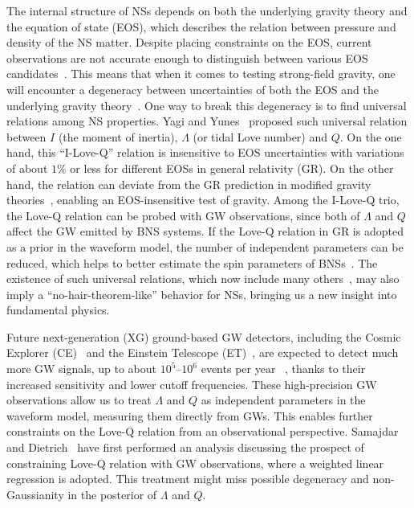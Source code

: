 \documentclass[a4paper,11pt]{article}
\begin{document}
The internal structure of NSs depends on both the underlying gravity theory 
and the equation of state (EOS), which describes the relation between pressure and
density of the NS matter. Despite placing constraints on the EOS, current 
observations are not accurate enough to distinguish between various EOS candidates~\cite{Lattimer:2006xb,Steiner:2010fz,Ozel:2010fw,Hebeler:2013nza,Özel_2013}. 
This means that when it comes to testing strong-field gravity, 
one will encounter a degeneracy between uncertainties of both the
EOS and the underlying gravity theory~\cite{Yagi:2013bca,Yagi:2013awa,Silva:2020acr,Shao:2022koz}. 
One way to break this degeneracy is to find universal relations among NS properties.
Yagi and Yunes~\cite{Yagi:2013bca,Yagi:2013awa} proposed such universal relation between 
$I$ (the moment of inertia), $\Lambda$ (or tidal Love number) and $Q$. 
On the one hand, this ``I-Love-Q'' relation is insensitive to EOS uncertainties 
with variations of about $1\%$ or less for different EOSs in general relativity (GR). 
On the other hand, the relation can deviate from the GR prediction in modified gravity theories~\cite{Yagi_2017,Gupta:2017vsl,Yunes:2025xwp}, 
enabling an EOS-insensitive test of gravity. Among the I-Love-Q trio, 
the Love-Q relation can be probed with GW observations, 
since both of $\Lambda$ and $Q$ affect the GW emitted by BNS systems. 
If the Love-Q relation in GR is adopted as a prior in the waveform
model, the number of independent parameters can be reduced, which helps to
better estimate the spin parameters of BNSs~\cite{Yagi:2013bca,LIGOScientific:2018cki,
LIGOScientific:2018hze,LIGOScientific:2020aai}. The existence of 
such universal relations, 
which now include many others~\cite{Lau:2009bu,Yagi:2013sva,Maselli:2013mva,Pani:2015nua,Yagi:2016qmr,Gao:2023mwu,Hu:2025gab}, 
may also imply a ``no-hair-theorem-like'' behavior for NSs, bringing us a new 
insight into fundamental physics. 

Future next-generation (XG) ground-based GW detectors, including the Cosmic Explorer 
(CE)~\cite{Reitze:2019iox,Reitze:2019dyk} and the Einstein Telescope (ET)~\cite{Punturo:2010zz,Hild:2010id,Sathyaprakash:2012jk}, 
are expected to
 detect much more GW signals, up to about $10^5$--$10^6$ events per year
~\cite{LIGOScientific:2017zlf,Sathyaprakash:2019yqt,Kalogera:2021bya,Samajdar:2021egv}, 
thanks to their 
increased sensitivity and lower cutoff frequencies. These high-precision GW observations allow us to treat $\Lambda$ and $Q$ as independent parameters in the waveform model, 
measuring them directly from GWs. This enables further constraints on the Love-Q relation from an observational perspective.
Samajdar and Dietrich~\cite{Samajdar:2020xrd} 
have first performed an analysis discussing the prospect of constraining Love-Q 
relation with GW observations, where a weighted linear regression is adopted.
This treatment might miss possible degeneracy and non-Gaussianity in the posterior of $\Lambda$ and $Q$. 
\end{document}
